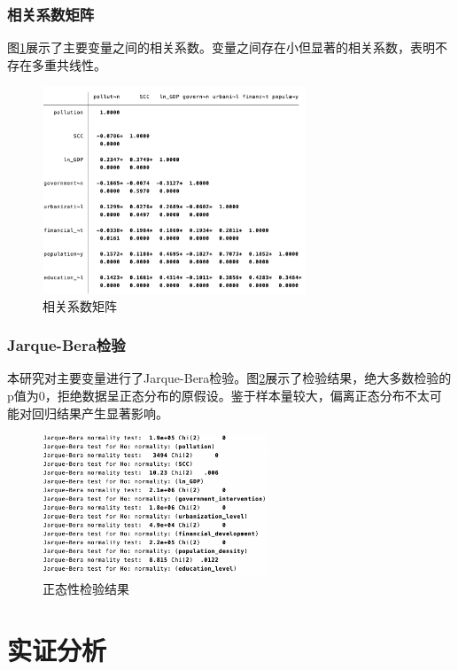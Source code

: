 \documentclass[a4paper,12pt]{article}
\begin{document}
\subsubsection{相关系数矩阵}
图\ref{fig:Correlation}展示了主要变量之间的相关系数。变量之间存在小但显著的相关系数，表明不存在多重共线性。
\begin{figure}[H]
    \centering
    \includegraphics[width=0.7\textwidth]{Correlation.png}
    \caption{相关系数矩阵}
    \label{fig:Correlation}  
\end{figure}


\subsubsection{Jarque-Bera检验}

本研究对主要变量进行了Jarque-Bera检验。图\ref{fig:JB}展示了检验结果，绝大多数检验的p值为0，拒绝数据呈正态分布的原假设。鉴于样本量较大，偏离正态分布不太可能对回归结果产生显著影响。

\begin{figure}[H]
    \centering
    \includegraphics[width=0.6\textwidth]{JB.png} 
    \caption{正态性检验结果}
    \label{fig:JB}  
\end{figure}

\section{实证分析}
\end{document}
